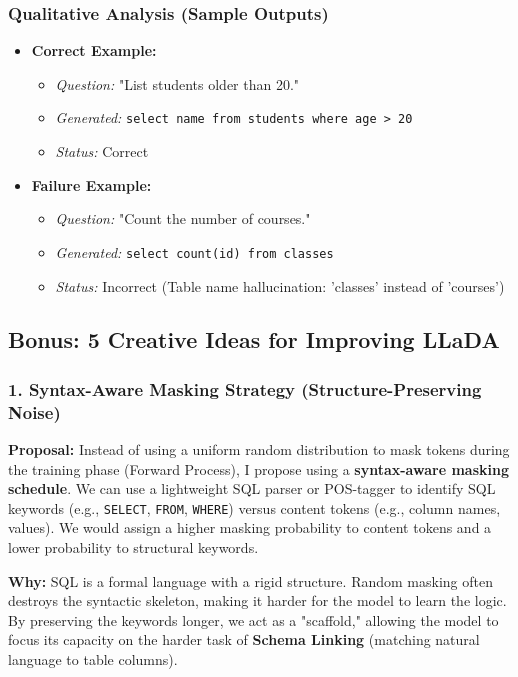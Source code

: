 \documentclass[a4paper,12pt]{article}
\begin{document}
\subsubsection*{Qualitative Analysis (Sample Outputs)}
\begin{itemize}
    \item \textbf{Correct Example:}
    \begin{itemize}
        \item \textit{Question:} "List students older than 20."
        \item \textit{Generated:} \texttt{select name from students where age > 20}
        \item \textit{Status:} Correct
    \end{itemize}
    \item \textbf{Failure Example:}
    \begin{itemize}
        \item \textit{Question:} "Count the number of courses."
        \item \textit{Generated:} \texttt{select count(id) from classes}
        \item \textit{Status:} Incorrect (Table name hallucination: 'classes' instead of 'courses')
    \end{itemize}
\end{itemize}

\subsection{Bonus: 5 Creative Ideas for Improving LLaDA}

\subsubsection*{1. Syntax-Aware Masking Strategy (Structure-Preserving Noise)}

\textbf{Proposal:} Instead of using a uniform random distribution to mask tokens during the training phase (Forward Process), I propose using a \textbf{syntax-aware masking schedule}. We can use a lightweight SQL parser or POS-tagger to identify SQL keywords (e.g., \texttt{SELECT}, \texttt{FROM}, \texttt{WHERE}) versus content tokens (e.g., column names, values). We would assign a higher masking probability to content tokens and a lower probability to structural keywords.

\textbf{Why:} SQL is a formal language with a rigid structure. Random masking often destroys the syntactic skeleton, making it harder for the model to learn the logic. By preserving the keywords longer, we act as a "scaffold," allowing the model to focus its capacity on the harder task of \textbf{Schema Linking} (matching natural language to table columns).
\end{document}
